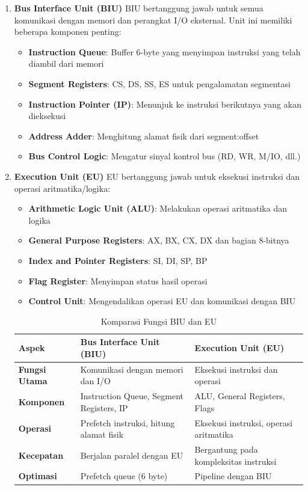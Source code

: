 \documentclass[../main.tex]{subfiles}
\begin{document}
        \begin{enumerate}
            \item \textbf{Bus Interface Unit (BIU)}
BIU bertanggung jawab untuk semua komunikasi dengan memori dan perangkat I/O eksternal. Unit ini memiliki beberapa komponen penting:

\begin{itemize}
    \item \textbf{Instruction Queue}: Buffer 6-byte yang menyimpan instruksi yang telah diambil dari memori
    \item \textbf{Segment Registers}: CS, DS, SS, ES untuk pengalamatan segmentasi
    \item \textbf{Instruction Pointer (IP)}: Menunjuk ke instruksi berikutnya yang akan dieksekusi
    \item \textbf{Address Adder}: Menghitung alamat fisik dari segment:offset
    \item \textbf{Bus Control Logic}: Mengatur sinyal kontrol bus (RD, WR, M/IO, dll.)
\end{itemize}

            \item \textbf{Execution Unit (EU)}
EU bertanggung jawab untuk eksekusi instruksi dan operasi aritmatika/logika:

\begin{itemize}
    \item \textbf{Arithmetic Logic Unit (ALU)}: Melakukan operasi aritmatika dan logika
    \item \textbf{General Purpose Registers}: AX, BX, CX, DX dan bagian 8-bitnya
    \item \textbf{Index and Pointer Registers}: SI, DI, SP, BP
    \item \textbf{Flag Register}: Menyimpan status hasil operasi
    \item \textbf{Control Unit}: Mengendalikan operasi EU dan komunikasi dengan BIU
\end{itemize}

        \begin{table}[H]
            \centering
            \caption{Komparasi Fungsi BIU dan EU}
            \begin{tabular}{|p{3.0cm}|p{5cm}|p{5cm}|}
\hline
\textbf{Aspek} & \textbf{Bus Interface Unit (BIU)} & \textbf{Execution Unit (EU)} \\
\hline
\textbf{Fungsi Utama} & Komunikasi dengan memori dan I/O & Eksekusi instruksi dan operasi \\
\hline
\textbf{Komponen} & Instruction Queue, Segment Registers, IP & ALU, General Registers, Flags \\
\hline
\textbf{Operasi} & Prefetch instruksi, hitung alamat fisik & Eksekusi instruksi, operasi aritmatika \\
\hline
\textbf{Kecepatan} & Berjalan paralel dengan EU & Bergantung pada kompleksitas instruksi \\
\hline
\textbf{Optimasi} & Prefetch queue (6 byte) & Pipeline dengan BIU \\
\hline
            \end{tabular}
            \label{tab:biu-eu-comparison}
        \end{table}


\end{enumerate}
\end{document}
